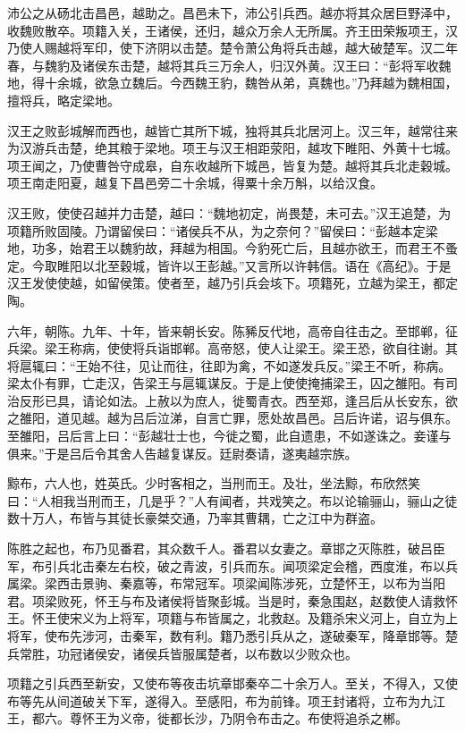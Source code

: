 \documentclass[]{article}
\begin{document}
沛公之从砀北击昌邑，越助之。昌邑未下，沛公引兵西。越亦将其众居巨野泽中，收魏败散卒。项籍入关，王诸侯，还归，越众万余人无所属。齐王田荣叛项王，汉乃使人赐越将军印，使下济阴以击楚。楚令萧公角将兵击越，越大破楚军。汉二年春，与魏豹及诸侯东击楚，越将其兵三万余人，归汉外黄。汉王曰：``彭将军收魏地，得十余城，欲急立魏后。今西魏王豹，魏咎从弟，真魏也。''乃拜越为魏相国，擅将兵，略定梁地。

汉王之败彭城解而西也，越皆亡其所下城，独将其兵北居河上。汉三年，越常往来为汉游兵击楚，绝其粮于梁地。项王与汉王相距荥阳，越攻下睢阳、外黄十七城。项王闻之，乃使曹咎守成皋，自东收越所下城邑，皆复为楚。越将其兵北走穀城。项王南走阳夏，越复下昌邑旁二十余城，得粟十余万斛，以给汉食。

汉王败，使使召越并力击楚，越曰：``魏地初定，尚畏楚，未可去。''汉王追楚，为项籍所败固陵。乃谓留侯曰：``诸侯兵不从，为之奈何？''留侯曰：``彭越本定梁地，功多，始君王以魏豹故，拜越为相国。今豹死亡后，且越亦欲王，而君王不蚤定。今取睢阳以北至穀城，皆许以王彭越。''又言所以许韩信。语在《高纪》。于是汉王发使使越，如留侯策。使者至，越乃引兵会垓下。项籍死，立越为梁王，都定陶。

六年，朝陈。九年、十年，皆来朝长安。陈豨反代地，高帝自往击之。至邯郸，征兵梁。梁王称病，使使将兵诣邯郸。高帝怒，使人让梁王。梁王恐，欲自往谢。其将扈辄曰：``王始不往，见让而往，往即为禽，不如遂发兵反。''梁王不听，称病。梁太仆有罪，亡走汉，告梁王与扈辄谋反。于是上使使掩捕梁王，囚之雒阳。有司治反形已具，请论如法。上赦以为庶人，徙蜀青衣。西至郑，逢吕后从长安东，欲之雒阳，道见越。越为吕后泣涕，自言亡罪，愿处故昌邑。吕后许诺，诏与俱东。至雒阳，吕后言上曰：``彭越壮士也，今徙之蜀，此自遗患，不如遂诛之。妾谨与俱来。''于是吕后令其舍人告越复谋反。廷尉奏请，遂夷越宗族。

黥布，六人也，姓英氏。少时客相之，当刑而王。及壮，坐法黥，布欣然笑曰：``人相我当刑而王，几是乎？''人有闻者，共戏笑之。布以论输骊山，骊山之徒数十万人，布皆与其徒长豪桀交通，乃率其曹耦，亡之江中为群盗。

陈胜之起也，布乃见番君，其众数千人。番君以女妻之。章邯之灭陈胜，破吕臣军，布引兵北击秦左右校，破之青波，引兵而东。闻项梁定会稽，西度淮，布以兵属梁。梁西击景驹、秦嘉等，布常冠军。项梁闻陈涉死，立楚怀王，以布为当阳君。项梁败死，怀王与布及诸侯将皆聚彭城。当是时，秦急围赵，赵数使人请救怀王。怀王使宋义为上将军，项籍与布皆属之，北救赵。及籍杀宋义河上，自立为上将军，使布先涉河，击秦军，数有利。籍乃悉引兵从之，遂破秦军，降章邯等。楚兵常胜，功冠诸侯安，诸侯兵皆服属楚者，以布数以少败众也。

项籍之引兵西至新安，又使布等夜击坑章邯秦卒二十余万人。至关，不得入，又使布等先从间道破关下军，遂得入。至感阳，布为前锋。项王封诸将，立布为九江王，都六。尊怀王为义帝，徙都长沙，乃阴令布击之。布使将追杀之郴。
\end{document}
